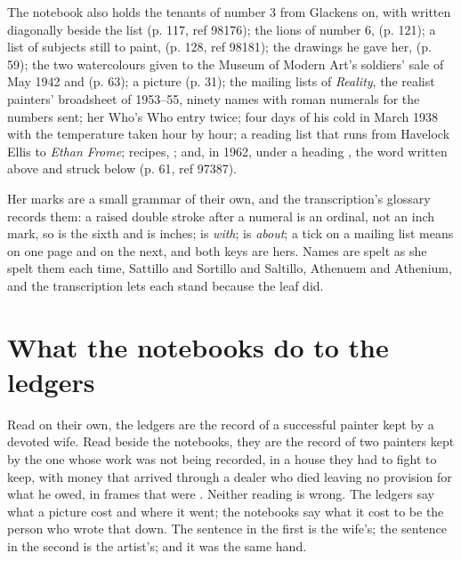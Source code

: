 The notebook also holds the tenants of number 3 from Glackens on, with  written diagonally beside the list (p. 117, ref 98176); the lions of number 6,  (p. 121); a list of subjects still to paint,  (p. 128, ref 98181); the drawings he gave her,  (p. 59); the two watercolours given to the Museum of Modern Art's soldiers' sale of May 1942 and  (p. 63); a picture  (p. 31); the mailing lists of \emph{Reality}, the realist painters' broadsheet of 1953--55, ninety names with roman numerals for the numbers sent; her Who's Who entry twice; four days of his cold in March 1938 with the temperature taken hour by hour; a reading list that runs from Havelock Ellis to \emph{Ethan Frome}; recipes, ; and, in 1962, under a heading , the word  written above and struck below (p. 61, ref 97387).

Her marks are a small grammar of their own, and the transcription's glossary records them: a raised double stroke after a numeral is an ordinal, not an inch mark, so  is the sixth and  is inches;  is \emph{with};  is \emph{about}; a tick on a mailing list means  on one page and  on the next, and both keys are hers. Names are spelt as she spelt them each time, Sattillo and Sortillo and Saltillo, Athenuem and Athenium, and the transcription lets each stand because the leaf did.



\section{What the notebooks do to the ledgers}

Read on their own, the ledgers are the record of a successful painter kept by a devoted wife. Read beside the notebooks, they are the record of two painters kept by the one whose work was not being recorded, in a house they had to fight to keep, with money that arrived through a dealer who died leaving no provision for what he owed, in frames that were . Neither reading is wrong. The ledgers say what a picture cost and where it went; the notebooks say what it cost to be the person who wrote that down. The sentence in the first is the wife's; the sentence in the second is the artist's; and it was the same hand.
